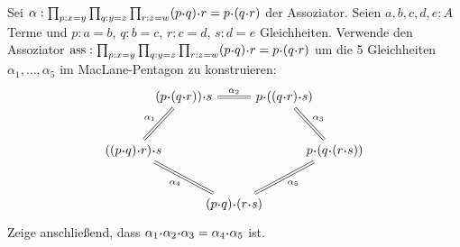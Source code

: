 \documentclass{uebung}
\begin{document}
\begin{exercise}
  Sei $\alpha:\prod_{p:x=y}\prod_{q:y=z}\prod_{r:z=w} (p\kon q)\kon r = p \kon (q\kon r)$ der Assoziator.
  Seien $a,b,c,d,e:A$ Terme und $p:a=b$, $q:b=c$, $r:c=d$, $s:d=e$ Gleichheiten.
  Verwende den Assoziator $\ass:\prod_{p:x=y}\prod_{q:y=z}\prod_{r:z=w} (p\kon q)\kon r = p \kon (q\kon r)$ um die 5 Gleichheiten $\alpha_1,\dots,\alpha_5$ im MacLane-Pentagon zu konstruieren:
  \begin{equation*}
    \begin{tikzcd}[column sep={between origins,1.4cm},row sep={between origins,1.5cm}]
      & (p \kon (q \kon r)) \kon s
      \arrow[rr,equal,"\alpha_2"]
      && p \kon ((q \kon r) \kon s)
      \arrow[dr,equal,"\alpha_3"]
      &
      \\
      ((p \kon q) \kon r) \kon s
      \arrow[ur,equal,"\alpha_1"]
      \arrow[drr,equal,"\alpha_4"']
      &&&& p \kon (q \kon (r \kon s))
      \\
      && (p \kon q) \kon (r \kon s)
      \arrow[urr,equal,"\alpha_5"']
      &&
    \end{tikzcd}
  \end{equation*}
  Zeige anschließend, dass $\alpha_1\kon\alpha_2\kon\alpha_3 = \alpha_4\kon\alpha_5$ ist.
\end{exercise}
\end{document}
